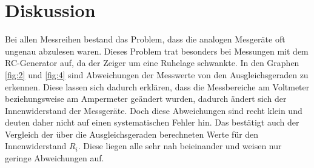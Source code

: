\section{Diskussion}
Bei allen Messreihen bestand das Problem, dass die analogen Mesgeräte
oft ungenau abzulesen waren. Dieses Problem trat besonders bei Messungen mit
dem RC-Generator auf, da der Zeiger um eine Ruhelage schwankte.
In den Graphen \ref{fig:2} und \ref{fig:4} sind Abweichungen der Messwerte von den
Ausgleichsgeraden zu erkennen. Diese lassen sich dadurch erklären, dass
die Messbereiche am Voltmeter beziehungsweise am Ampermeter geändert wurden,
dadurch ändert sich der Innenwiderstand der Messgeräte. Doch diese Abweichungen
sind recht klein und deuten daher nicht auf einen systematischen Fehler hin.
Das bestätigt auch der Vergleich der über die Ausgleichsgeraden berechneten
Werte für den Innenwiderstand $R_{i}$. Diese liegen alle sehr nah beieinander
und weisen nur geringe Abweichungen auf.




\label{sec:Diskussion}
